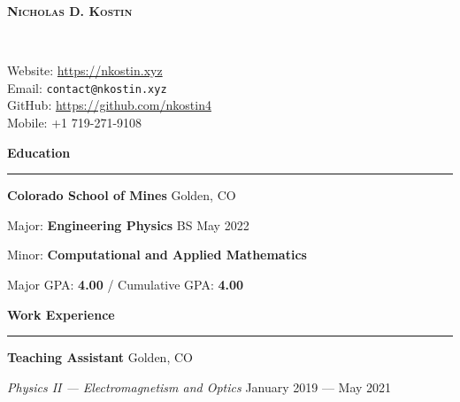\documentclass{article}
\begin{document}
\begin{minipage}{0.63\textwidth}
\begin{flushleft}
\textbf{\textsc{\Huge{Nicholas D. Kostin}}}
\end{flushleft}
\end{minipage}
~
\begin{minipage}{0.35\textwidth}
\begin{flushright}
\parbox[c]{\textwidth}{Website: \url{https://nkostin.xyz} \\ Email: \texttt{contact@nkostin.xyz} \\ GitHub: \url{https://github.com/nkostin4} \\ Mobile: +1 719-271-9108}
\end{flushright}
\end{minipage}

\vspace{1em}

\textbf{\Large{Education}} \\[-0.5em]
\rule{\textwidth}{1pt}

\hspace{1.5em} \textbf{Colorado School of Mines} \hfill Golden, CO

\hspace{1.5em} Major: \textbf{Engineering Physics} \hfill BS May 2022

\hspace{1.5em} Minor: \textbf{Computational and Applied Mathematics}

\vspace{1em}

\hspace{1.5em} Major GPA: \textbf{4.00} / Cumulative GPA: \textbf{4.00}

\vspace{1em}

\textbf{\Large{Work Experience}} \\[-0.5em]
\rule{\textwidth}{1pt}

\hspace{1.5em} \textbf{Teaching Assistant} \hfill Golden, CO

\hspace{1.5em} \textit{Physics II --- Electromagnetism and Optics} \hfill January 2019 --- May 2021
\end{document}
